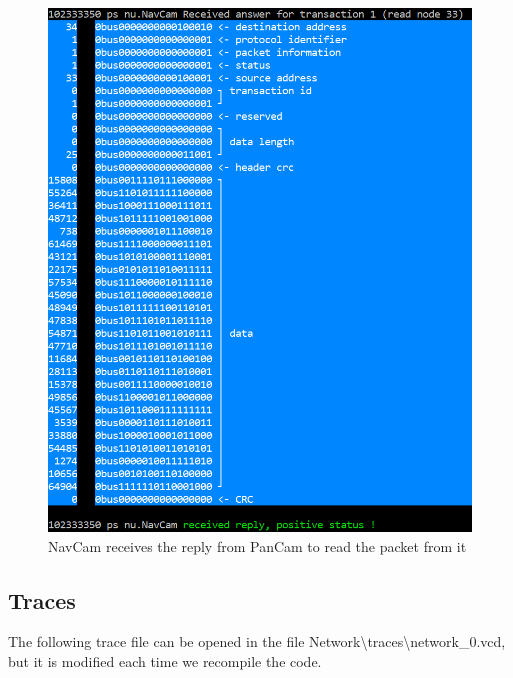 \documentclass[12pt,a4paper]{article}
\begin{document}
\pagebreak

\begin{figure}[hb]
	\centering
    \includegraphics[scale = 0.5]{results/NavCam_receives_reply_from_PanCam.png}
    \caption{NavCam receives the reply from PanCam to read the packet from it}
\end{figure}

\pagebreak

\subsection{Traces}

The following trace file can be opened in the file Network\textbackslash traces\textbackslash network\_0.vcd, but it is modified each time we recompile the code.

\smallbreak
\end{document}
